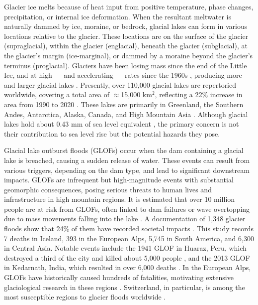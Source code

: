 Glacier ice melts because of heat input from positive temperature, phase changes, precipitation, or internal ice deformation. When the resultant meltwater is naturally dammed by ice, moraine, or bedrock, glacial lakes can form in various locations relative to the glacier. These locations are on the surface of the glacier (supraglacial), within the glacier (englacial), beneath the glacier (subglacial), at the glacier's margin (ice-marginal), or dammed by a moraine beyond the glacier's terminus (proglacial). Glaciers have been losing mass since the end of the Little Ice, and at high — and accelerating — rates since the 1960s \cite{Huggonet2022,Zemp2019}, producing more and larger glacial lakes \cite{Zhang&al2024}. Presently, over 110,000 glacial lakes are repertoried worldwide, covering a total area of  $\approx$15,000 km$^2$, reflecting a 22\% increase in area from 1990 to 2020 \cite{Zhang&al2024}. These lakes are primarily in Greenland, the Southern Andes, Antarctica, Alaska, Canada, and High Mountain Asia \citep{Shugar&al2020}. Although glacial lakes hold about 0.43 mm of sea level equivalent \cite{Shugar&al2020}, the primary concern is not their contribution to sea level rise but the potential hazards they pose.

Glacial lake outburst floods (GLOFs) occur when the dam containing a glacial lake is breached, causing a sudden release of water. These events can result from various triggers, depending on the dam type, and lead to significant downstream impacts. GLOFs are infrequent but high-magnitude events with substantial geomorphic consequences, posing serious threats to human lives and infrastructure in high mountain regions. It is estimated that over 10 million people are at risk from GLOFs, often linked to dam failures or wave overtopping due to mass movements falling into the lake \citep{Zhang&al2024}. A documentation of 1,348 glacier floods show that 24\% of them have recorded societal impacts .
This study records 7 deaths in Iceland, 393 in the European Alps, 5,745 in South America, and 6,300 in Central Asia. Notable events include the 1941 GLOF in Huaraz, Peru, which destroyed a third of the city and killed about 5,000 people , and the 2013 GLOF in Kedarnath, India, which resulted in over 6,000 deaths . In the European Alps, GLOFs have historically caused hundreds of fatalities, motivating extensive glaciological research in these regions \citep{Haeberli1983, Vincent&al2010b, Ancey&al2019, Veh&al2022}. Switzerland, in particular, is among the most susceptible regions to glacier floods worldwide \cite{Carrivick&Tweed2016}.

